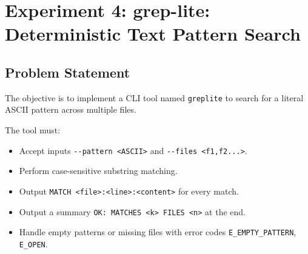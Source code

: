 
\section{Experiment 4: grep-lite: Deterministic Text Pattern Search}

\subsection{Problem Statement}
The objective is to implement a CLI tool named \texttt{greplite} to search for a literal ASCII pattern across multiple files.

The tool must:
\begin{itemize}
    \item Accept inputs \verb|--pattern <ASCII>| and \verb|--files <f1,f2...>|.
    \item Perform case-sensitive substring matching.
    \item Output \verb|MATCH <file>:<line>:<content>| for every match.
    \item Output a summary \verb|OK: MATCHES <k> FILES <n>| at the end.
    \item Handle empty patterns or missing files with error codes \verb|E_EMPTY_PATTERN|, \verb|E_OPEN|.
\end{itemize}

